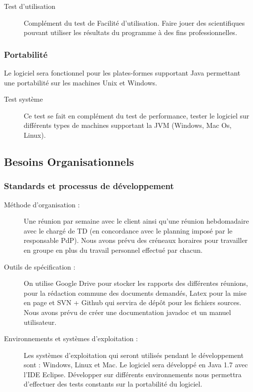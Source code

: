 \documentclass[a4paper,12pt]{article}
\begin{document}
\begin{description}
\item[Test d’utilisation] Complément du test de Facilité d’utilisation. Faire jouer des scientifiques pouvant utiliser les résultats du programme à des fins professionnelles.
\end{description}

\subsubsection{Portabilité}

Le logiciel sera fonctionnel pour les plates-formes supportant Java permettant une portabilité sur les machines Unix et Windows.

\begin{description}
\item[Test système] Ce test se fait en complément du test de performance, tester le logiciel sur différents types de machines supportant la JVM (Windows, Mac Os, Linux).
\end{description}

\subsection{Besoins Organisationnels}

\subsubsection{Standards et processus de développement}

\begin{description}
\item[Méthode d’organisation :]
Une réunion par semaine avec le client ainsi qu'une réunion hebdomadaire avec le chargé de TD (en concordance avec le planning imposé par le responsable PdP).
Nous avons prévu des créneaux horaires pour travailler en groupe en plus du travail personnel effectué par chacun.

\item[Outils de spécification :]
On utilise Google Drive pour stocker les rapports des différentes réunions, pour la rédaction commune des documents demandés, Latex pour la mise en page et SVN + Github qui servira de dépôt pour les fichiers sources. 
Nous avons prévu de créer une documentation javadoc et un manuel utilisateur. 

\item [Environnements et systèmes d’exploitation :]
Les systèmes d’exploitation qui seront utilisés pendant le développement sont : Windows, Linux et Mac. Le logiciel sera développé en Java 1.7 avec l’IDE Eclipse. Développer sur différents environnements nous permettra d'effectuer des tests constants sur la portabilité du logiciel.

\end{description}
\end{document}
